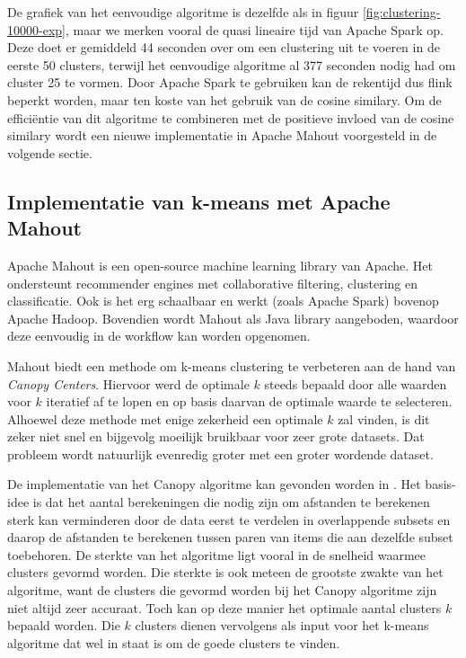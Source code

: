 De grafiek van het eenvoudige algoritme is dezelfde als in figuur \ref{fig:clustering-10000-exp}, maar we merken vooral de quasi lineaire tijd van Apache Spark op. Deze doet er gemiddeld 44 seconden over om een clustering uit te voeren in de eerste 50 clusters, terwijl het eenvoudige algoritme al 377 seconden nodig had om cluster 25 te vormen. Door Apache Spark te gebruiken kan de rekentijd dus flink beperkt worden, maar ten koste van het gebruik van de cosine similary. Om de effici\"entie van dit algoritme te combineren met de positieve invloed van de cosine similary wordt een nieuwe implementatie in Apache Mahout voorgesteld in de volgende sectie.

\subsection{Implementatie van k-means met Apache Mahout}\label{mahout}
Apache Mahout \cite{Owen2011} is een open-source machine learning library van Apache. Het ondersteunt recommender engines met collaborative filtering, clustering en classificatie. Ook is het erg schaalbaar en werkt (zoals Apache Spark) bovenop Apache Hadoop. Bovendien wordt Mahout als Java library aangeboden, waardoor deze eenvoudig in de workflow kan worden opgenomen.

Mahout biedt een methode om k-means clustering te verbeteren aan de hand van \textit{Canopy Centers}. Hiervoor werd de optimale $k$ steeds bepaald door alle waarden voor $k$ iteratief af te lopen en op basis daarvan de optimale waarde te selecteren. Alhoewel deze methode met enige zekerheid een optimale $k$ zal vinden, is dit zeker niet snel en bijgevolg moeilijk bruikbaar voor zeer grote datasets. Dat probleem wordt natuurlijk evenredig groter met een groter wordende dataset. 

De implementatie van het Canopy algoritme kan gevonden worden in \cite{McCallum2000}. Het basis-idee is dat het aantal berekeningen die nodig zijn om afstanden te berekenen sterk kan verminderen door de data eerst te verdelen in overlappende subsets en daarop de afstanden te berekenen tussen paren van items die aan dezelfde subset toebehoren. De sterkte van het algoritme ligt vooral in de snelheid waarmee clusters gevormd worden. Die sterkte is ook meteen de grootste zwakte van het algoritme, want de clusters die gevormd worden bij het Canopy algoritme zijn niet altijd zeer accuraat. Toch kan op deze manier het optimale aantal clusters $k$ bepaald worden. Die $k$ clusters dienen vervolgens als input voor het k-means algoritme dat wel in staat is om de goede clusters te vinden.

